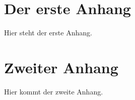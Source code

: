\begin{appendix}


\chapter{Der erste Anhang}

Hier steht der erste Anhang.


\chapter{Zweiter Anhang}

Hier kommt der zweite Anhang.


\end{appendix}
